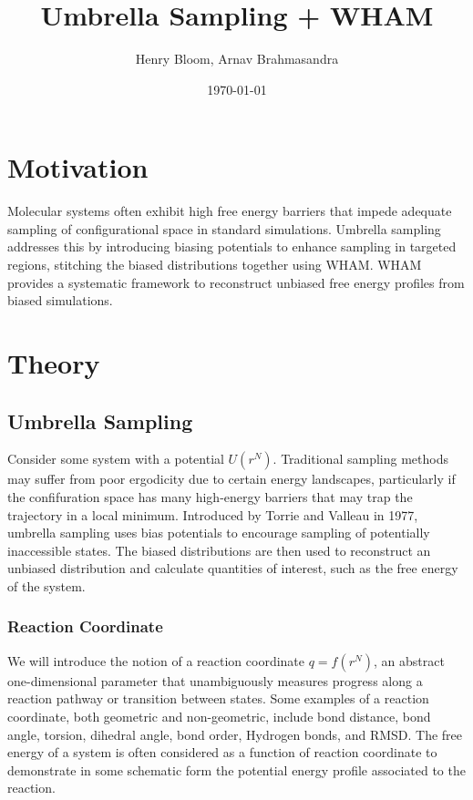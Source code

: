 \documentclass{article}
\title{Umbrella Sampling + WHAM}
\author{Henry Bloom, Arnav Brahmasandra}
\date{\today}
\begin{document}
\maketitle

\section{Motivation}
Molecular systems often exhibit high free energy barriers that impede adequate sampling of configurational space in standard simulations. 
Umbrella sampling addresses this by introducing biasing potentials to enhance sampling in targeted regions, stitching the biased distributions together using WHAM.
WHAM provides a systematic framework to reconstruct unbiased free energy profiles from biased simulations. 

\section{Theory}

\subsection{Umbrella Sampling}
Consider some system with a potential $U(r^N)$. 
Traditional sampling methods may suffer from poor ergodicity due to certain energy landscapes, particularly if the confifuration space has many high-energy barriers that may trap the trajectory in a local minimum.
Introduced by Torrie and Valleau in 1977, umbrella sampling uses bias potentials to encourage sampling of potentially inaccessible states.
The biased distributions are then used to reconstruct an unbiased distribution and calculate quantities of interest, such as the free energy of the system.

\subsubsection{Reaction Coordinate}
We will introduce the notion of a reaction coordinate $q = f(r^N)$, an abstract one-dimensional parameter that unambiguously measures progress along a reaction pathway or transition between states.
Some examples of a reaction coordinate, both geometric and non-geometric, include bond distance, bond angle, torsion, dihedral angle, bond order, Hydrogen bonds, and RMSD. 
The free energy of a system is often considered as a function of reaction coordinate to demonstrate in some schematic form the potential energy profile associated to the reaction.
\end{document}

